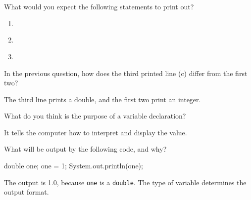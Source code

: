 \Q What would you expect the following statements to print out?

\begin{enumerate}
\item {}          
\item {}\texttt{~~} 
\item {}\texttt{~~} 
\end{enumerate}


\Q In the previous question, how does the third printed line (c) differ from the first two?

\begin{answer}
The third line prints a double, and the first two print an integer.
\end{answer}


\Q \label{vardecl}
What do you think is the purpose of a variable declaration?

\begin{answer}
It tells the computer how to interpret and display the value.
\end{answer}


\Q What will be output by the following code, and why?

\begin{minipage}[t]{0.33\linewidth}

\vspace{-2ex}
\begin{javalst}
double one;
one = 1;
System.out.println(one);
\end{javalst}

\end{minipage}
\hfill
\begin{minipage}[t]{0.66\linewidth}

\begin{answer}[3em]
The output is 1.0, because {\tt one} is a {\tt double}.
The type of variable determines the output format.
\end{answer}

\end{minipage}
